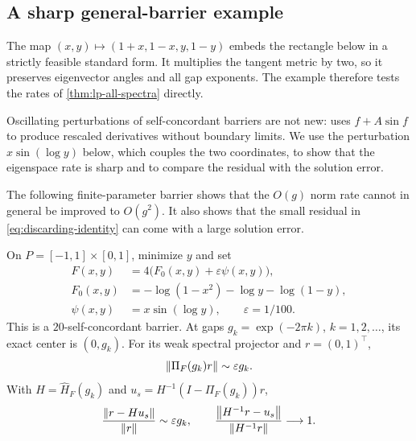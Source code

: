 \subsection{A sharp general-barrier example}

The map $(x,y)\mapsto(1+x,1-x,y,1-y)$ embeds the rectangle below in
a strictly feasible standard form. It multiplies the tangent metric by
two, so it preserves eigenvector angles and all gap exponents. The
example therefore tests the rates of \cref{thm:lp-all-spectra}
directly.

Oscillating perturbations of self-concordant barriers are not new:
\citet[Remark 2.3]{duistermaat2001} uses $f+A\sin f$ to produce
rescaled derivatives without boundary limits. We use the perturbation
$x\sin(\log y)$ below, which couples the two coordinates, to show that
the eigenspace rate is sharp and to compare the residual with the
solution error.

The following finite-parameter barrier shows that the $O(g)$ norm rate
cannot in general be improved to $O(g^2)$. It also shows that the
small residual in \eqref{eq:discarding-identity} can come with a large
solution error.

\begin{proposition}
\label{prop:oscillatory-barrier}
On $P=[-1,1]\times[0,1]$, minimize $y$ and set
\begin{equation}
 \begin{aligned}
 F(x,y)&=4\bigl(F_0(x,y)+\varepsilon\psi(x,y)\bigr),\\
 F_0(x,y)&=-\log(1-x^2)-\log y-\log(1-y),\\
 \psi(x,y)&=x\sin(\log y),\qquad\varepsilon=1/100.
 \end{aligned}
 \label{eq:oscillatory-barrier}
\end{equation}
This is a $20$-self-concordant barrier. At gaps
$g_k=\exp(-2\pi k)$, $k=1,2,\ldots$, its exact center is $(0,g_k)$.
For its weak spectral projector and $r=(0,1)^\top$,
\begin{equation}
 \left\lVert \Pi_F(g_k)r\right\rVert\sim\varepsilon g_k.
 \label{eq:oscillatory-sharpness}
\end{equation}
With $H=\widehat H_F(g_k)$ and $u_s=H^{-1}(I-\Pi_F(g_k))r$,
\begin{equation}
 \frac{\left\lVert r-Hu_s\right\rVert}{\left\lVert r\right\rVert}\sim\varepsilon g_k,
 \qquad
 \frac{\left\lVert H^{-1}r-u_s\right\rVert}{\left\lVert H^{-1}r\right\rVert}\longrightarrow1.
 \label{eq:residual-direction-separation}
\end{equation}
\end{proposition}

